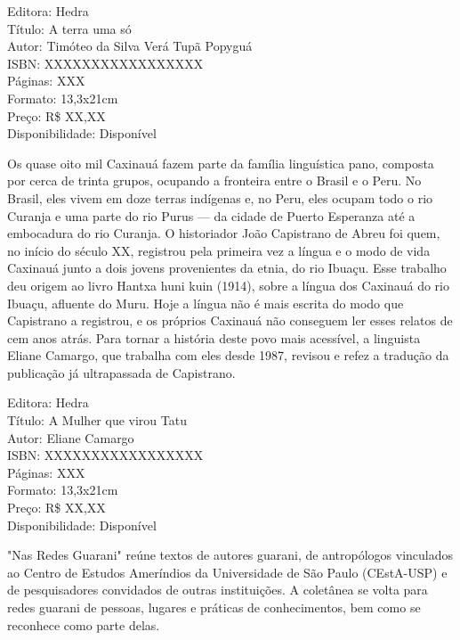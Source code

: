 \begin{ficha}
Editora: Hedra\\
Título: A terra uma só\\
Autor:  Timóteo da Silva Verá Tupã Popyguá\\ 
ISBN: XXXXXXXXXXXXXXXXX\\
Páginas: XXX\\
Formato: 13,3x21cm\\
Preço: R\$ XX,XX\\
Disponibilidade: Disponível
\end{ficha}

\pagebreak


\noindent{}Os quase oito mil Caxinauá fazem parte da família linguística pano, composta por cerca de trinta grupos, ocupando a fronteira entre o Brasil e o Peru. No Brasil, eles vivem em doze terras indígenas e, no Peru, eles ocupam todo o rio Curanja e uma parte do rio Purus — da cidade de Puerto Esperanza até a embocadura do rio Curanja. O historiador João Capistrano de Abreu foi quem, no início do século XX, registrou pela primeira vez a língua e o modo de vida Caxinauá junto a dois jovens provenientes da etnia, do rio Ibuaçu. Esse trabalho deu origem ao livro Hantxa huni kuin (1914), sobre a língua dos Caxinauá do rio Ibuaçu, afluente do Muru. Hoje a língua não é mais escrita do modo que Capistrano a registrou, e os próprios Caxinauá não conseguem ler esses relatos de cem anos atrás. Para tornar a história deste povo mais acessível, a linguista Eliane Camargo, que trabalha com eles desde 1987, revisou e refez a tradução da publicação já ultrapassada de Capistrano.

\begin{ficha}
Editora: Hedra\\
Título: A Mulher que virou Tatu\\
Autor:  Eliane Camargo\\ 
ISBN: XXXXXXXXXXXXXXXXX\\
Páginas: XXX\\
Formato: 13,3x21cm\\
Preço: R\$ XX,XX\\
Disponibilidade: Disponível
\end{ficha}

\pagebreak


\noindent{}"Nas Redes Guarani" reúne textos de autores guarani, de antropólogos vinculados ao Centro de Estudos Ameríndios da Universidade de São Paulo (CEstA-USP) e de pesquisadores convidados de outras instituições. A coletânea se volta para redes guarani de pessoas, lugares e práticas de conhecimentos, bem como se reconhece como parte delas.

